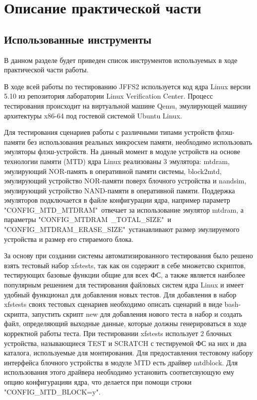 \section{Описание практической части}
\label{sec:Chapter4} 

\subsection{Использованные инструменты}

В данном разделе будет приведен список инструментов используемых в ходе практической части работы.

В ходе всей работы по тестированию JFFS2 используется код ядра Linux версии 5.10 из репозитория лаборатории Linux Verification Center. Процесс тестирования происходит на виртуальной машине Qemu, эмулирующей машину архитектуры x86-64 под гостевой системой Ubuntu Linux.

Для тестирования сценариев работы с различными типами устройств флэш-памяти без использования реальных микросхем памяти, необходимо использовать эмуляторы флэш-устройств. На данный момент в модуле устройств на основе технологии памяти (MTD) ядра Linux реализованы 3 эмулятора: mtdram, эмулирующий NOR-память в оперативной памяти системы, block2mtd, эмулирующий устройство NOR-памяти поверх блочного устройства и nandsim, эмулирующий устройство NAND-памяти в оперативной памяти. Поддержка эмуляторов подключается в файле конфигурации ядра, например параметр "CONFIG\_MTD\_MTDRAM"\ отвечает за использование эмулятор mtdram, а параметры "CONFIG\_MTDRAM\ \_TOTAL\_SIZE"\ и "CONFIG\_MTDRAM\_ERASE\_SIZE"\ устанавливают размер эмулируемого устройства и размер его стираемого блока.

За основу при создании системы автоматизированного тестирования было решено взять тестовый набор xfstests, так как он содержит в себе множетсво скриптов, тестирующих базовые функции общие для всех ФС, а также является наиболее популярным решением для тестирования файловых систем ядра Linux и имеет удобный функционал для добавления новых тестов. Для добавления в набор xfstests своих тестовых сценариев необходимо описать сценарий в виде bash-скрипта, запустить скрипт new для добавления нового теста в набор и создать файл, определяющий выходные данные, которые должны генерироваться в ходе корректной работы теста. При тестировании xfstests использует 2 блочных устройства, называющиеся TEST и SCRATCH с тестируемой ФС на них и два каталога, используемые для монтирования. Для предоставления тестовому набору интерфейса блочного устройства в модуле MTD есть драйвер mtdblock. Для использования этого драйвера необходимо установить соответсвующую ему опцию конфигурацияи ядра, что делается при помощи строки  "CONFIG\_MTD\_BLOCK=y".

